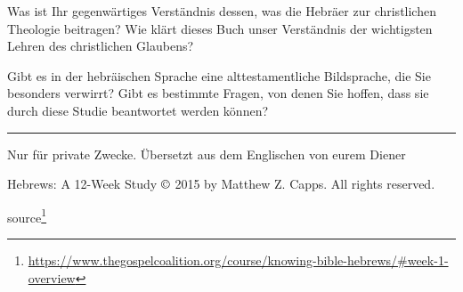 \documentclass[
  12pt,
]{krantz}
\renewcommand{\href}[2]{#2\footnote{\url{#1}}}
\begin{document}
Was ist Ihr gegenwärtiges Verständnis dessen, was die Hebräer zur christlichen Theologie beitragen? Wie klärt dieses Buch unser Verständnis der wichtigsten Lehren des christlichen Glaubens?

Gibt es in der hebräischen Sprache eine alttestamentliche Bildsprache, die Sie besonders verwirrt? Gibt es bestimmte Fragen, von denen Sie hoffen, dass sie durch diese Studie beantwortet werden können?

\begin{center}\rule{0.5\linewidth}{0.5pt}\end{center}

Nur für private Zwecke. Übersetzt aus dem Englischen von eurem Diener

Hebrews: A 12-Week Study \(\copyright\) 2015 by Matthew Z. Capps. All rights reserved.

\href{https://www.thegospelcoalition.org/course/knowing-bible-hebrews/\#week-1-overview}{source}

  

\printindex
\end{document}
